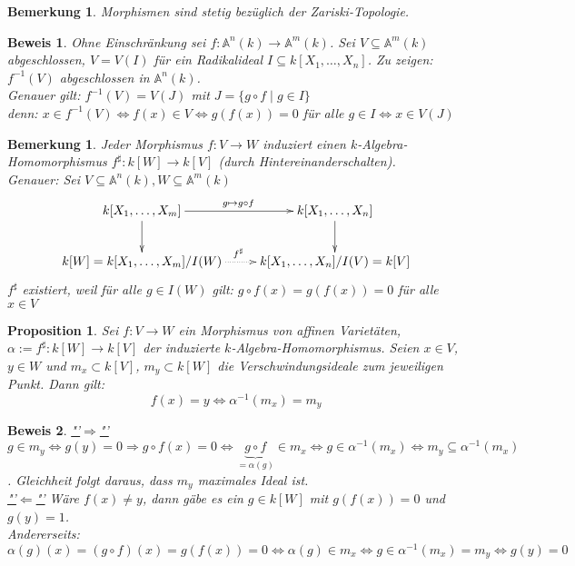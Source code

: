 \documentclass[a4paper,12pt]{report}
\theoremstyle{break}
\newtheorem{Bem}[Def]{Bemerkung}
\newtheorem{Prop}[Def]{Proposition}
\theoremstyle{nonumberbreak}
\theoremstyle{nonumberplain}
\newtheorem{Bew}{Beweis}
\begin{document}
\begin{Bem}
\label{bem:5.3}
Morphismen sind stetig bezüglich der Zariski-Topologie.
\end{Bem}
\begin{Bew}
Ohne Einschränkung sei $f : \mathbb{A}^n(k)\rightarrow\mathbb{A}^m(k)$. Sei $V\subseteq \mathbb{A}^m(k)$ abgeschlossen, $V=V(I)$ für ein Radikalideal $I\subseteq k[X_1,\dots,X_n]$. Zu zeigen: $f^{-1}(V)$ abgeschlossen in $\mathbb{A}^n(k)$.\\
Genauer gilt: $f^{-1}(V)=V(J)$ mit $J=\{g\circ f \mid g\in I\}$\\
denn: $x\in f^{-1}(V) \Leftrightarrow f(x)\in V \Leftrightarrow g(f(x))=0$ für alle $g\in I\Leftrightarrow x\in V(J)$
\end{Bew}
\begin{Bem}
Jeder Morphismus $f:V\rightarrow W$ induziert einen $k$-Algebra-Homomorphismus $f^{\sharp}: k[W]\rightarrow k[V]$ (durch Hintereinanderschalten).\\
Genauer: Sei $V\subseteq \mathbb{A}^n(k), W\subseteq \mathbb{A}^m(k)$
\[
\begin{xy}
\xymatrix{
k[X_1,\dots,X_m]\ar[d]\ar[r]^{g\mapsto g\circ f}&k[X_1,\dots,X_n]\ar[d]\\
k[W]=k[X_1,\dots,X_m]/I(W)\ar@{.>}[r]^{f^{\sharp}}&k[X_1,\dots,X_n]/I(V)=k[V]
}
\end{xy}
\]
$f^{\sharp}$ existiert, weil für alle $g\in I(W)$ gilt: $g\circ f(x) = g(f(x))=0$ für alle $x\in V$
\end{Bem}
\begin{Prop}
Sei $f: V\rightarrow W$ ein Morphismus von affinen Varietäten, $\alpha:= f^{\sharp}: k[W]\rightarrow k[V]$ der induzierte $k$-Algebra-Homomorphismus. Seien $x\in V$, $y\in W$ und $m_x\subset k[V]$, $m_y\subset k[W]$ die Verschwindungsideale zum jeweiligen Punkt. Dann gilt:
$$f(x)=y\Leftrightarrow \alpha^{-1}(m_x)= m_y$$
\end{Prop}
\begin{Bew}
\underline{"'$\Rightarrow$"'} $g\in m_y \Leftrightarrow g(y)=0\Rightarrow g\circ f(x)=0 \Leftrightarrow \underbrace{g\circ f}_{= \alpha(g)} \in m_x \Leftrightarrow g\in \alpha^{-1}(m_x) \Leftrightarrow m_y \subseteq \alpha^{-1}(m_x)$. Gleichheit folgt daraus, dass $m_y$ maximales Ideal ist.\\
\underline{"'$\Leftarrow$"'} Wäre $f(x)\neq y$, dann gäbe es  ein $g\in k[W]$ mit $g(f(x))=0$ und $g(y)=1$.\\
Andererseits:\\
$\alpha(g)(x)=(g\circ f)(x)=g(f(x))=0\Leftrightarrow \alpha(g)\in m_x \Leftrightarrow g\in \alpha^{-1}(m_x)=m_y \Leftrightarrow g(y)=0$
\end{Bew}
\end{document}
